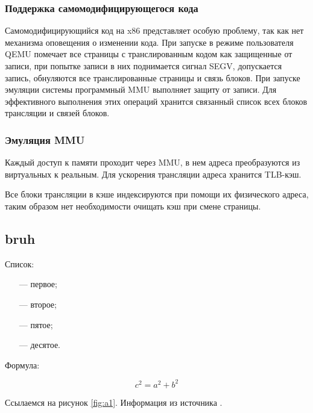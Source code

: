 \subsubsection{Поддержка самомодифицирующегося кода}

Самомодифицирующийся код на x86 представляет особую проблему, так как нет механизма оповещения о изменении кода. При запуске в режиме пользователя QEMU помечает все страницы с транслированным кодом как защищенные от записи, при попытке записи в них поднимается сигнал SEGV, допускается запись, обнуляются все транслированные страницы и связь блоков. При запуске эмуляции системы программный MMU выполняет защиту от записи.
Для эффективного выполнения этих операций хранится связанный список всех блоков трансляции и связей блоков.

\subsubsection{Эмуляция MMU}

Каждый доступ к памяти проходит через MMU, в нем адреса преобразуются из виртуальных к реальным. Для ускорения трансляции адреса хранится TLB-кэш.

Все блоки трансляции в кэше индексируются при помощи их физического адреса, таким образом нет необходимости очищать кэш при смене страницы.

\subsection{bruh}

Список:

\begin{itemize}[leftmargin=1.6\parindent]
	\item[---] первое;
	\item[---] второе;
	\item[---] пятое;
	\item[---] десятое.
\end{itemize}

Формула:

\begin{equation}
c^2 = a^2 + b^2
\end{equation}

Ссылаемся на рисунок \ref{fig:a1}. Информация из источника \cite{golang}.

